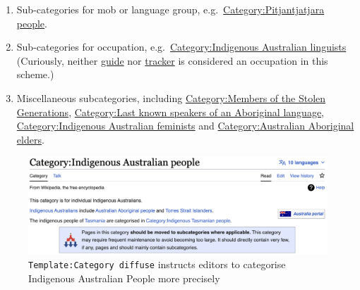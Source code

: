 \documentclass[
  a4paper,
  DIV=11,
  numbers=noendperiod]{scrreprt}
\providecommand{\tightlist}{%
  \setlength{\itemsep}{0pt}\setlength{\parskip}{0pt}}\usepackage{longtable,booktabs,array}
\begin{document}
\begin{enumerate}
\def\labelenumi{\arabic{enumi}.}
\tightlist
\item
  Sub-categories for mob or language group,
  e.g.~\href{https://en.wikipedia.org/w/index.php?title=Category:Pitjantjatjara_people\&oldid=1141634439}{Category:Pitjantjatjara
  people}.
\item
  Sub-categories for occupation,
  e.g.~\href{https://en.wikipedia.org/w/index.php?title=Category:Indigenous_Australian_linguists\&oldid=1139800186}{Category:Indigenous
  Australian linguists} (Curiously, neither
  \href{https://en.wikipedia.org/w/index.php?title=Category:Australian_Aboriginal_guides\&action=info}{guide}
  nor
  \href{https://en.wikipedia.org/w/index.php?title=Category:Australian_Aboriginal_trackers\&oldid=1141656309}{tracker}
  is considered an occupation in this scheme.)
\item
  Miscellaneous subcategories, including
  \href{https://en.wikipedia.org/w/index.php?title=Category:Members_of_the_Stolen_Generations\&oldid=825612121}{Category:Members
  of the Stolen Generations},
  \href{https://en.wikipedia.org/w/index.php?title=Category:Last_known_speakers_of_an_Australian_Aboriginal_language\&oldid=951554350}{Category:Last
  known speakers of an Aboriginal language},
  \href{https://en.wikipedia.org/wiki/Category:Indigenous_Australian_feminists}{Category:Indigenous
  Australian feminists} and
  \href{https://en.wikipedia.org/w/index.php?title=Category:Australian_Aboriginal_elders\&oldid=940594168}{Category:Australian
  Aboriginal elders}.
\end{enumerate}

\begin{figure}

{\centering \includegraphics{assets/template-catdiffuse-indig-aus.png}

}

\caption{\label{fig-template-catdiffuse-indig-aus}\texttt{Template:Category\ diffuse}
instructs editors to categorise Indigenous Australian People more
precisely}

\end{figure}
\end{document}
